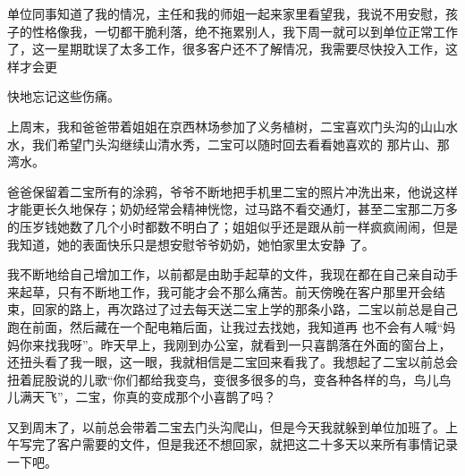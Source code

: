 \documentclass{article}
\begin{document}
单位同事知道了我的情况，主任和我的师姐一起来家里看望我，我说不用安慰，孩子的性格像我，一切都干脆利落，绝不拖累别人，我下周一就可以到单位正常工作了，这一星期耽误了太多工作，很多客户还不了解情况，我需要尽快投入工作，这样才会更
\newpage

快地忘记这些伤痛。 

上周末，我和爸爸带着姐姐在京西林场参加了义务植树，二宝喜欢门头沟的山山水水，我们希望门头沟继续山清水秀，二宝可以随时回去看看她喜欢的
那片山、那湾水。 

爸爸保留着二宝所有的涂鸦，爷爷不断地把手机里二宝的照片冲洗出来，他说这样才能更长久地保存；奶奶经常会精神恍惚，过马路不看交通灯，甚至二宝那二万多的压岁钱她数了几个小时都数不明白了；姐姐似乎还是跟从前一样疯疯闹闹，但是我知道，她的表面快乐只是想安慰爷爷奶奶，她怕家里太安静
了。 

我不断地给自己增加工作，以前都是由助手起草的文件，我现在都在自己亲自动手来起草，只有不断地工作，我可能才会不那么痛苦。前天傍晚在客户那里开会结束，回家的路上，再次路过了过去每天送二宝上学的那条小路，二宝以前总是自己跑在前面，然后藏在一个配电箱后面，让我过去找她，我知道再
\newpage
也不会有人喊“妈妈你来找我呀”。昨天早上，我刚到办公室，就看到一只喜鹊落在外面的窗台上，还扭头看了我一眼，这一眼，我就相信是二宝回来看我了。我想起了二宝以前总会扭着屁股说的儿歌“你们都给我变鸟，变很多很多的鸟，变各种各样的鸟，鸟儿鸟儿满天飞”，二宝，你真的变成那个小喜鹊了吗？
 

又到周末了，以前总会带着二宝去门头沟爬山，但是今天我就躲到单位加班了。上午写完了客户需要的文件，但是我还不想回家，就把这二十多天以来所有事情记录一下吧。
\end{document}
